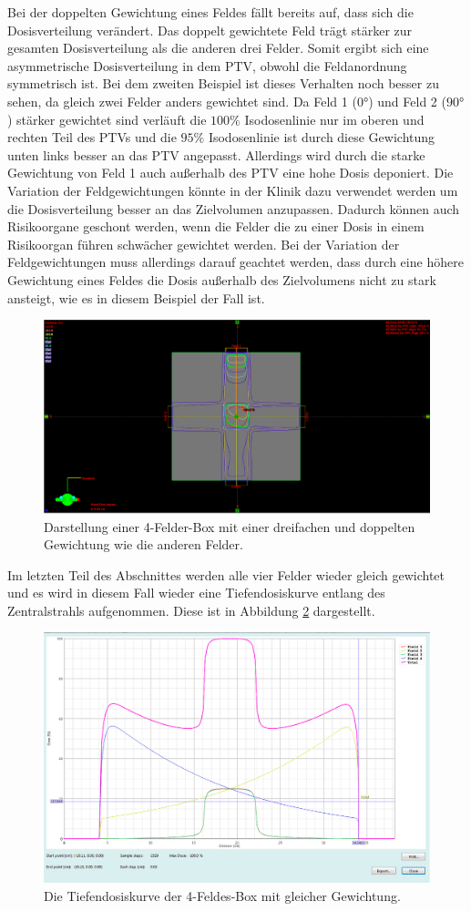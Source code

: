 Bei der doppelten Gewichtung eines Feldes fällt bereits auf, dass sich die Dosisverteilung
verändert. Das doppelt gewichtete Feld trägt stärker zur gesamten Dosisverteilung
als die anderen drei Felder. Somit ergibt sich eine asymmetrische Dosisverteilung
in dem PTV, obwohl die Feldanordnung symmetrisch ist.
Bei dem zweiten Beispiel ist dieses Verhalten noch besser zu sehen, da gleich zwei
Felder anders gewichtet sind. Da Feld 1 ($0°$) und Feld 2 ($90°$) stärker gewichtet
sind verläuft die $100\%$ Isodosenlinie nur im oberen und rechten Teil des PTVs
und die $95\%$ Isodosenlinie ist durch diese Gewichtung unten links besser an das PTV
angepasst. Allerdings wird durch die starke Gewichtung von Feld 1 auch außerhalb
des PTV eine hohe Dosis deponiert.
Die Variation der Feldgewichtungen könnte in der Klinik dazu verwendet werden um die
Dosisverteilung besser an das Zielvolumen anzupassen. Dadurch können auch Risikoorgane
geschont werden, wenn die Felder die zu einer Dosis in einem Risikoorgan führen
schwächer gewichtet werden.
Bei der Variation der Feldgewichtungen muss allerdings darauf geachtet werden, dass
durch eine höhere Gewichtung eines Feldes die Dosis außerhalb des Zielvolumens nicht
zu stark ansteigt, wie es in diesem Beispiel der Fall ist.

\begin{figure}[H]
	\centering
	\includegraphics[width=0.7\linewidth]{../../Wasserphantom Bilder/Aufgabe223}
	\caption{Darstellung einer 4-Felder-Box mit einer dreifachen und doppelten Gewichtung wie die anderen Felder.}
	\label{fig:aufgabe223}
\end{figure}

Im letzten Teil des Abschnittes werden alle vier Felder wieder gleich gewichtet und es wird in diesem Fall wieder eine Tiefendosiskurve entlang des Zentralstrahls aufgenommen.
Diese ist in Abbildung \ref{fig:aufgabe224} dargestellt.

\begin{figure}[H]
	\centering
	\includegraphics[width=0.7\linewidth]{../../Wasserphantom Bilder/Aufgabe224.png}
	\caption{Die Tiefendosiskurve der 4-Feldes-Box mit gleicher Gewichtung.}
	\label{fig:aufgabe224}
\end{figure}


